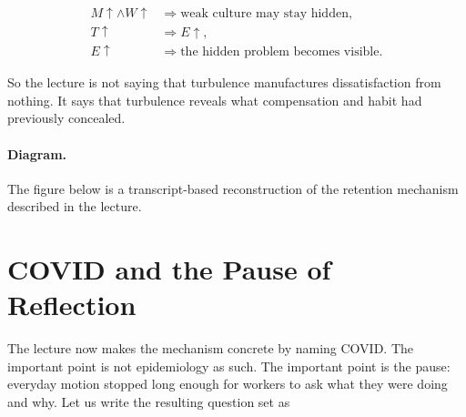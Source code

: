\begin{align}
M \uparrow \land W \uparrow &\Rightarrow \text{weak culture may stay hidden},\\
T \uparrow &\Rightarrow E \uparrow,\\
E \uparrow &\Rightarrow \text{the hidden problem becomes visible}.
\end{align}

So the lecture is not saying that turbulence manufactures dissatisfaction from nothing. It says that turbulence reveals what compensation and habit had previously concealed.

\paragraph{Diagram.} The figure below is a transcript-based reconstruction of the retention mechanism described in the lecture.

\begin{figure}
\centering
{}
\end{figure}

\section{COVID and the Pause of Reflection}

The lecture now makes the mechanism concrete by naming COVID. The important point is not epidemiology as such. The important point is the pause: everyday motion stopped long enough for workers to ask what they were doing and why. Let us write the resulting question set as

